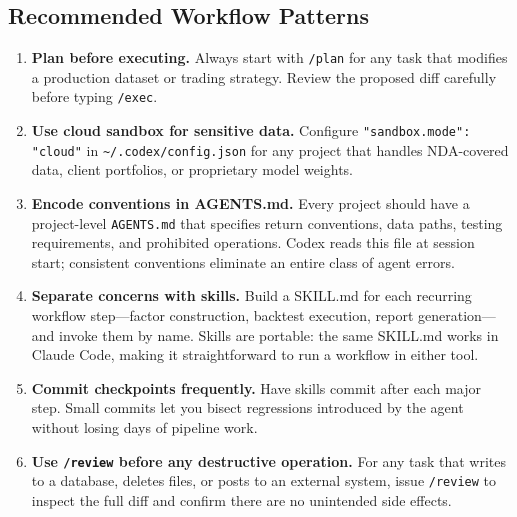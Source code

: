 \subsection{Recommended Workflow Patterns}
\label{app:codex:patterns}

\begin{enumerate}
  \item \textbf{Plan before executing.}  Always start with \texttt{/plan} for
        any task that modifies a production dataset or trading strategy.
        Review the proposed diff carefully before typing \texttt{/exec}.

  \item \textbf{Use cloud sandbox for sensitive data.}  Configure
        \texttt{"sandbox.mode": "cloud"} in \texttt{\textasciitilde/.codex/config.json}
        for any project that handles NDA-covered data, client portfolios, or
        proprietary model weights.

  \item \textbf{Encode conventions in AGENTS.md.}  Every project should have
        a project-level \texttt{AGENTS.md} that specifies return conventions,
        data paths, testing requirements, and prohibited operations.  Codex
        reads this file at session start; consistent conventions eliminate an
        entire class of agent errors.

  \item \textbf{Separate concerns with skills.}  Build a SKILL.md for each
        recurring workflow step---factor construction, backtest execution, report
        generation---and invoke them by name.  Skills are portable: the same
        SKILL.md works in Claude Code, making it straightforward to run a
        workflow in either tool.

  \item \textbf{Commit checkpoints frequently.}  Have skills commit after each
        major step.  Small commits let you bisect regressions introduced by the
        agent without losing days of pipeline work.

  \item \textbf{Use \texttt{/review} before any destructive operation.}  For
        any task that writes to a database, deletes files, or posts to an
        external system, issue \texttt{/review} to inspect the full diff and
        confirm there are no unintended side effects.
\end{enumerate}

